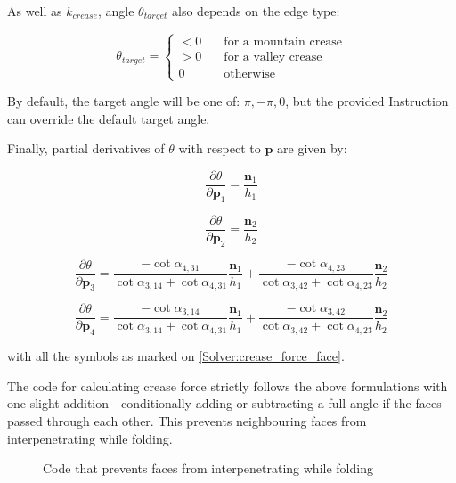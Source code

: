 As well as $k_{crease}$, angle $\theta _{target}$ also depends on the edge type:

$$
\theta _{target} =
\begin{cases}
	< 0 & \quad \text{for a mountain crease}\\
	> 0 & \quad \text{for a valley crease}\\
	0 & \quad \text{otherwise}
\end{cases}
$$

By default, the target angle will be one of: $\pi, -\pi, 0$, but the provided Instruction can override the default target angle.
\smallskip

Finally, partial derivatives of $\theta$ with respect to $\pmb{p}$ are given by:

\begin{equation} \label{Solver:crease_force1}
\frac{\partial \theta}{\partial \pmb{p}_1} = \frac{\pmb{n}_1}{h_1}
\end{equation}

\begin{equation} \label{Solver:crease_force2}
\frac{\partial \theta}{\partial \pmb{p}_2} = \frac{\pmb{n}_2}{h_2}
\end{equation}

\begin{equation} \label{Solver:crease_force3}
	\frac{\partial \theta}{\partial \pmb{p}_3} = \frac{-\cot{\alpha _{4,31}}}{\cot{\alpha _{3,14}} + \cot{\alpha _{4,31}}} \frac{\pmb{n}_1}{h_1} + \frac{-\cot{\alpha _{4,23}}}{\cot{\alpha _{3,42}} + \cot{\alpha _{4,23}}} \frac{\pmb{n}_2}{h_2} 
\end{equation}

\begin{equation} \label{Solver:crease_force4}
\frac{\partial \theta}{\partial \pmb{p}_4} = \frac{-\cot{\alpha _{3,14}}}{\cot{\alpha _{3,14}} + \cot{\alpha _{4,31}}} \frac{\pmb{n}_1}{h_1} + \frac{-\cot{\alpha _{3,42}}}{\cot{\alpha _{3,42}} + \cot{\alpha _{4,23}}} \frac{\pmb{n}_2}{h_2} 
\end{equation}

with all the symbols as marked on \autoref{Solver:crease_force_face}.
\smallskip

The code for calculating crease force strictly follows the above formulations with one slight
addition - conditionally adding or subtracting a full angle if the faces passed through each other.
This prevents neighbouring faces from interpenetrating while folding.

\begin{figure}[H]
	\caption{Code that prevents faces from interpenetrating while folding}
	
\end{figure}


